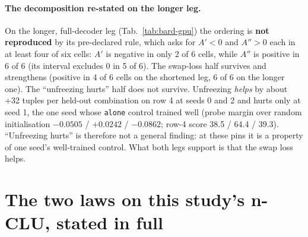 \documentclass{article} %
\begin{document}
\paragraph{The decomposition re-stated on the longer leg.} On the
longer, full-decoder leg (Tab.~\ref{tab:bard-gpu}) the ordering is \textbf{not reproduced} by its
pre-declared rule, which asks for $A'<0$ and $A''>0$ each in at least four of six cells: $A'$ is
negative in only 2 of 6 cells, while $A''$ is positive in 6 of 6 (its interval excludes 0 in 5 of %
6). The swap-loss half survives and strengthens (positive in 4 of 6 cells on the shortened leg, 6 %
of 6 on the longer one). The ``unfreezing hurts'' half does not survive. Unfreezing \emph{helps} by
about +32 tuples per held-out combination on row 4 at seeds 0 and 2 and hurts only at seed 1, the one seed whose %
\texttt{alone} control trained well (probe margin over random initialisation $-0.0505$ / %
$+0.0242$ / $-0.0862$; row-4 score 38.5 / 64.4 / 39.3). ``Unfreezing hurts'' is therefore not a %
general finding: at these pins it is a property of one seed's well-trained control. What both legs
support is that the swap loss helps.

\section{The two laws on this study's n-CLU, stated in full}
\label{app:laws}
\end{document}

